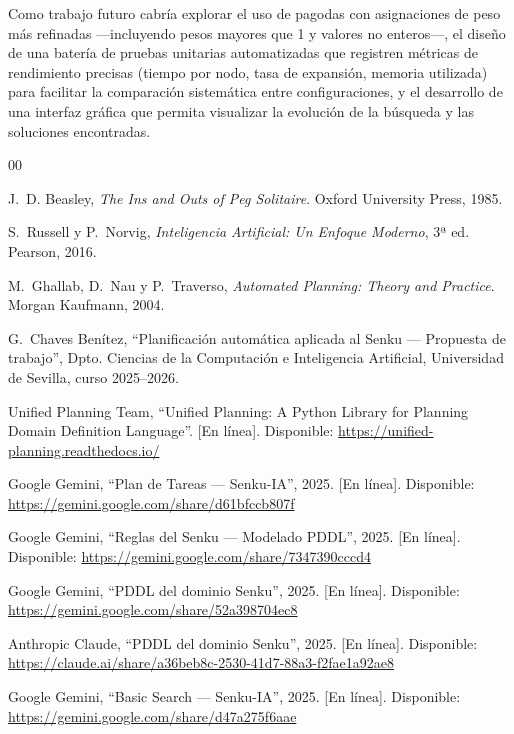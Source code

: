 \documentclass[conference,a4paper]{IEEEtran}
\begin{document}
Como trabajo futuro cabría explorar el uso de pagodas con asignaciones de
peso más refinadas —incluyendo pesos mayores que 1 y valores no enteros—,
el diseño de una batería de pruebas unitarias automatizadas que registren
métricas de rendimiento precisas (tiempo por nodo, tasa de expansión,
memoria utilizada) para facilitar la comparación sistemática entre
configuraciones, y el desarrollo de una interfaz gráfica que permita
visualizar la evolución de la búsqueda y las soluciones encontradas.


\begin{thebibliography}{00}

J.~D. Beasley, \textit{The Ins and Outs of Peg Solitaire}. Oxford University
Press, 1985.

S.~Russell y P.~Norvig, \textit{Inteligencia Artificial: Un Enfoque Moderno},
3ª ed. Pearson, 2016.

M.~Ghallab, D.~Nau y P.~Traverso, \textit{Automated Planning: Theory and
Practice}. Morgan Kaufmann, 2004.

G.~Chaves Benítez, ``Planificación automática aplicada al Senku — Propuesta de
trabajo'', Dpto. Ciencias de la Computación e Inteligencia Artificial,
Universidad de Sevilla, curso 2025--2026.

Unified Planning Team, ``Unified Planning: A Python Library for Planning
Domain Definition Language''. [En línea]. Disponible:
\url{https://unified-planning.readthedocs.io/}

Google Gemini, ``Plan de Tareas — Senku-IA'', 2025. [En línea]. Disponible:
\url{https://gemini.google.com/share/d61bfccb807f}

Google Gemini, ``Reglas del Senku — Modelado PDDL'', 2025. [En línea].
Disponible: \url{https://gemini.google.com/share/7347390cccd4}

Google Gemini, ``PDDL del dominio Senku'', 2025. [En línea]. Disponible:
\url{https://gemini.google.com/share/52a398704ec8}

Anthropic Claude, ``PDDL del dominio Senku'', 2025. [En línea]. Disponible:
\url{https://claude.ai/share/a36beb8c-2530-41d7-88a3-f2fae1a92ae8}

Google Gemini, ``Basic Search — Senku-IA'', 2025. [En línea]. Disponible:
\url{https://gemini.google.com/share/d47a275f6aae}


\end{thebibliography}
\end{document}
